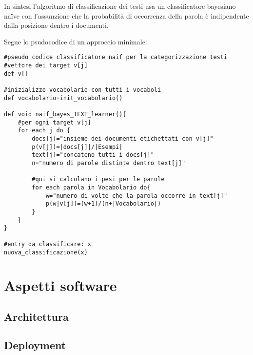 \documentclass{article}
\theoremstyle{plain}
\theoremstyle{definition}
\begin{document}
In sintesi l'algoritmo di classificazione dei testi usa un classificatore bayesiano naïve con l'assunzione che la probabilità di occorrenza della parola è indipendente dalla posizione dentro i documenti.

Segue lo psudocodice di un approccio minimale:
\begin{lstlisting}
#pseudo codice classificatore naif per la categorizzazione testi
#vettore dei target v[j]
def v[]

#inizializzo vocabolario con tutti i vocaboli
def vocabolario=init_vocabolario()

def void naif_bayes_TEXT_learner(){
	#per ogni target v[j]
	for each j do {
		docs[j]="insieme dei documenti etichettati con v[j]"
		p(v[j])=|docs[j]|/|Esempi|
		text[j]="concateno tutti i docs[j]"
		n="numero di parole distinte dentro text[j]"
		
		#qui si calcolano i pesi per le parole
		for each parola in Vocabolario do{
			w="numero di volte che la parola occorre in text[j]"
			p(w|v[j])=(w+1)/(n+|Vocabolario|)
		}
	}
}

#entry da classificare: x
nuova_classificazione(x)
\end{lstlisting}

\newpage
\section{Aspetti software}
\subsection{Architettura}
\subsection{Deployment}
\end{document}
